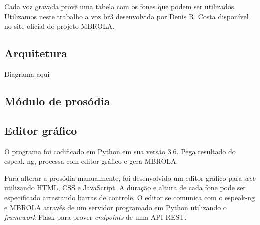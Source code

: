 Cada voz gravada provê uma tabela com os fones que podem ser utilizados. Utilizamos neste trabalho a voz br3 desenvolvida por Denis R. Costa disponível no site oficial do projeto MBROLA.

\subsection{Arquitetura}
Diagrama aqui

\subsection{Módulo de prosódia}

\subsection{Editor gráfico}
O programa foi codificado em Python em sua versão 3.6. Pega resultado do espeak-ng, processa com editor gráfico e gera MBROLA.

Para alterar a prosódia manualmente, foi desenvolvido um editor gráfico
para \emph{web} utilizando HTML, CSS e JavaScript. A duração e altura de cada
fone pode ser especificado arrastando barras de controle. O editor se comunica
com o espeak-ng e MBROLA através de um servidor programado em Python utilizando
o \emph{framework} Flask para prover \emph{endpoints} de uma API REST.

